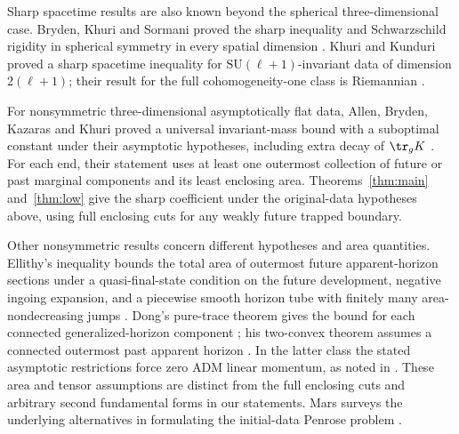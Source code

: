 Sharp spacetime results are also known beyond the spherical
three-dimensional case. Bryden, Khuri and Sormani proved the sharp
inequality and Schwarzschild rigidity in spherical symmetry in every
spatial dimension \cite{BrydenKhuriSormani2021}. Khuri and Kunduri proved a sharp spacetime
inequality for $\mathrm{SU}(\ell+1)$-invariant data of dimension $2(\ell+1)$;
their result for the full cohomogeneity-one class is Riemannian
\cite{KhuriKunduri2025}.

For nonsymmetric three-dimensional asymptotically flat data, Allen,
Bryden, Kazaras and Khuri proved a universal invariant-mass bound with
a suboptimal constant under their asymptotic hypotheses, including extra
decay of $\tr_gK$ \cite{AllenBrydenKazarasKhuri2025}. For each end, their statement uses
at least one outermost collection of future or past marginal components
and its least enclosing area. Theorems~\ref{thm:main} and~\ref{thm:low}
give the sharp coefficient under the original-data hypotheses above,
using full enclosing cuts for any weakly future trapped boundary.

Other nonsymmetric results concern different hypotheses and area
quantities. Ellithy's inequality bounds the total area of outermost future
apparent-horizon sections under a quasi-final-state condition on the
future development, negative ingoing expansion, and a piecewise smooth
horizon tube with finitely many area-nondecreasing jumps
\cite{Ellithy2026}. Dong's pure-trace theorem gives the
bound for each connected generalized-horizon component
\cite{Dong2026Sigma}; his two-convex theorem assumes a
connected outermost past apparent horizon
\cite{Dong2026TwoConvex}. In the latter class the stated
asymptotic restrictions force zero ADM linear momentum, as noted in
\cite{Dong2026TwoConvex}. These area and tensor assumptions
are distinct from the full enclosing cuts and arbitrary second fundamental
forms in our statements. Mars surveys the underlying alternatives in
formulating the initial-data Penrose problem \cite{Mars2009}.
